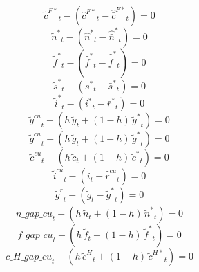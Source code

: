 \begin{dmath}
{{\tilde c^{F*}}}_{t}-\left({{\hat c^{F*}}}_{t}-{{\hat {\bar c}^{F*}}}_{t}\right)=0
\end{dmath}
\begin{dmath}
{{\tilde n^*}}_{t}-\left({{\hat n^*}}_{t}-{{\hat {\bar n}^*}}_{t}\right)=0
\end{dmath}
\begin{dmath}
{{\tilde f^*}}_{t}-\left({{\hat f^*}}_{t}-{{\hat {\bar f}^*}}_{t}\right)=0
\end{dmath}
\begin{dmath}
{{\tilde s^*}}_{t}-\left({{s^*}}_{t}-{{\bar s^*}}_{t}\right)=0
\end{dmath}
\begin{dmath}
{{\tilde i^*}}_{t}-\left({{i^*}}_{t}-{{\bar r^*}}_{t}\right)=0
\end{dmath}
\begin{dmath}
{{\tilde y^{cu}}}_{t}-\left({{h}}\, {{\tilde y}}_{t}+\left(1-{{h}}\right)\, {{\tilde y^*}}_{t}\right)=0
\end{dmath}
\begin{dmath}
{{\tilde g^{cu}}}_{t}-\left({{h}}\, {{\tilde g}}_{t}+\left(1-{{h}}\right)\, {{\tilde g^*}}_{t}\right)=0
\end{dmath}
\begin{dmath}
{{\tilde c^{cu}}}_{t}-\left({{h}}\, {{\tilde c}}_{t}+\left(1-{{h}}\right)\, {{\tilde c^*}}_{t}\right)=0
\end{dmath}
\begin{dmath}
{{\tilde i^{cu}}}_{t}-\left({{i}}_{t}-{{\hat {\bar r}^{cu}}}_{t}\right)=0
\end{dmath}
\begin{dmath}
{{\tilde g^{r}}}_{t}-\left({{\tilde g}}_{t}-{{\tilde g^*}}_{t}\right)=0
\end{dmath}
\begin{dmath}
{n\_gap\_cu}_{t}-\left({{h}}\, {{\tilde n}}_{t}+\left(1-{{h}}\right)\, {{\tilde n^*}}_{t}\right)=0
\end{dmath}
\begin{dmath}
{f\_gap\_cu}_{t}-\left({{h}}\, {{\tilde f}}_{t}+\left(1-{{h}}\right)\, {{\tilde f^*}}_{t}\right)=0
\end{dmath}
\begin{dmath}
{c\_H\_gap\_cu}_{t}-\left({{h}}\, {{\tilde c^H}}_{t}+\left(1-{{h}}\right)\, {{\tilde c^{H*}}}_{t}\right)=0
\end{dmath}
